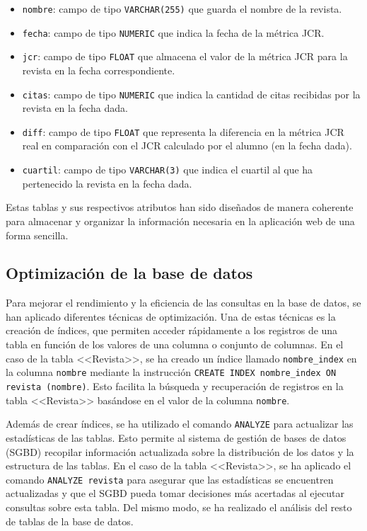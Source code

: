 \begin{itemize}
    \item \texttt{nombre}: campo de tipo \texttt{VARCHAR(255)} que guarda el nombre de la revista.
    \item \texttt{fecha}: campo de tipo \texttt{NUMERIC} que indica la fecha de la métrica JCR.
    \item \texttt{jcr}: campo de tipo \texttt{FLOAT} que almacena el valor de la métrica JCR para la revista en la fecha correspondiente.
    \item \texttt{citas}: campo de tipo \texttt{NUMERIC} que indica la cantidad de citas recibidas por la revista en la fecha dada.
    \item \texttt{diff}: campo de tipo \texttt{FLOAT} que representa la diferencia en la métrica JCR real en comparación con el JCR calculado por el alumno (en la fecha dada).
    \item \texttt{cuartil}: campo de tipo \texttt{VARCHAR(3)} que indica el cuartil al que ha pertenecido la revista en la fecha dada.
\end{itemize}
 
Estas tablas y sus respectivos atributos han sido diseñados de manera coherente para almacenar y organizar la información necesaria en la aplicación web de una forma sencilla.

\subsection{Optimización de la base de datos}

Para mejorar el rendimiento y la eficiencia de las consultas en la base de datos, se han aplicado diferentes técnicas de optimización. Una de estas técnicas es la creación de índices, que permiten acceder rápidamente a los registros de una tabla en función de los valores de una columna o conjunto de columnas. En el caso de la tabla <<Revista>>, se ha creado un índice llamado \texttt{nombre\_index} en la columna \texttt{nombre} mediante la instrucción \texttt{CREATE INDEX nombre\_index ON revista (nombre)}. Esto facilita la búsqueda y recuperación de registros en la tabla <<Revista>> basándose en el valor de la columna \texttt{nombre}.

Además de crear índices, se ha utilizado el comando \texttt{ANALYZE} para actualizar las estadísticas de las tablas. Esto permite al sistema de gestión de bases de datos (SGBD) recopilar información actualizada sobre la distribución de los datos y la estructura de las tablas. En el caso de la tabla <<Revista>>, se ha aplicado el comando \texttt{ANALYZE revista} para asegurar que las estadísticas se encuentren actualizadas y que el SGBD pueda tomar decisiones más acertadas al ejecutar consultas sobre esta tabla. Del mismo modo, se ha realizado el análisis del resto de tablas de la base de datos.

